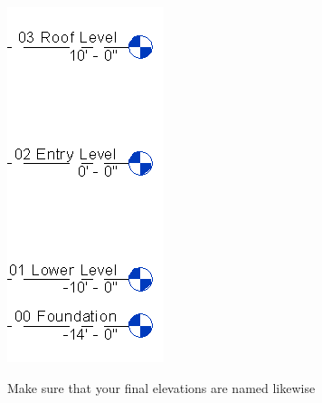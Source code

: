 \documentclass{tufte-book} %
\begin{document}
\begin{enumerate}
	\begin{marginfigure}
		\includegraphics[width=\linewidth]{revitelevationsname.png}
		\caption[The names of elevation lines]{Make sure that your final elevations are named likewise}
		\label{fig:revelevname}
	\end{marginfigure}
	

\end{enumerate}
\end{document}
